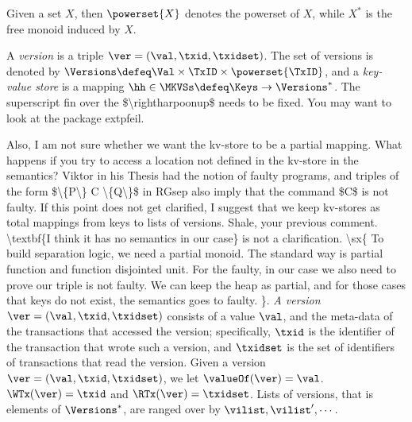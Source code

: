 Given a set $X$, then $\powerset{X}$ denotes 
the powerset of $X$, while $X^{\ast}$ is the free monoid induced by $X$.


\begin{definition}
\label{def:his_heap}
\label{def:mkvs}
A \emph{version} is a triple $\ver = (\val, \txid, \txidset)$. The set of versions is denoted by $\Versions \defeq \Val \times \TxID \times \powerset{\TxID}$, 
and a \emph{key-value store} is a mapping $\hh \in \MKVSs \defeq \Keys \rightarrow \Versions^{\ast}$. 
\ac{ The superscript fin over the $\rightharpoonup$ needs to be fixed. You may want to look at the package extpfeil.}
\end{definition}
\ac{Also, I am not sure whether we want the kv-store to be a partial mapping. What happens if you try to access a location not 
defined in the kv-store in the semantics? Viktor in his Thesis had the notion of faulty programs, and triples of the form 
$\{P\} C \{Q\}$ in RGsep also imply that the command $C$ is not faulty. If this point  does not get clarified, 
I suggest that we keep kv-stores as total mappings from keys to lists of versions. Shale, 
your previous comment. \textbf{I think it has no semantics in our case} is not a clarification.
\sx{ 
    To build separation logic, we need a partial monoid. 
    The standard way is partial function and function disjointed unit.
    For the faulty, in our case we also need to prove our triple is not faulty.
    We can keep the heap as partial, and for those cases that keys do not exist, the semantics goes to faulty.
    }.
}
\emph{A version} $\ver = (\val, \txid, \txidset)$ consists of a value $\val$, and the meta-data of the transactions 
that accessed the version; specifically, $\txid$ is the identifier of the transaction that wrote such a version, 
and $\txidset$ is the set of identifiers of transactions that read the version.
Given a version $\ver = (\val, \txid, \txidset)$, we let $\valueOf(\ver) = \val$. 
$\WTx(\ver) = \txid$ and $\RTx(\ver) = \txidset$.
Lists of versions, that is elements of $\Versions^{\ast}$, are ranged over by $\vilist, \vilist',\cdots$.

